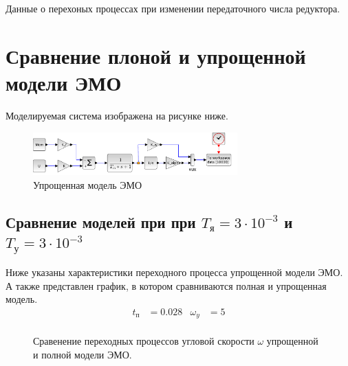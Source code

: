 \documentclass[a4paper, 12pt]{article}
\begin{document}
\begin{table}[h!]
    \centering
    \begin{threeparttable}
        \caption{Данные о перехоных процессах при изменении передаточного числа редуктора.}
        \end{threeparttable}
\end{table}

\newpage
\section{Сравнение плоной и упрощенной модели ЭМО}

Моделируемая система изображена на рисунке ниже.

\begin{figure}[h!]
    \centering
    \includegraphics[width = 0.7\textwidth]{images/EasyModel/easy-model.pdf}
    \caption{Упрощенная модель ЭМО}
\end{figure}

\subsection{Сравнение моделей при при $T_\text{я} = 3\cdot10^{-3}$ и $T_\text{у} = 3\cdot10^{-3}$}
Ниже указаны характеристики переходного процесса упрощенной модели ЭМО. А также представлен график, в котором сравниваются полная и упрощенная модель.
\begin{align*}
    t_\text{п} & = 0.028 & \omega_y & = 5 \\
\end{align*}

\begin{figure}[h!]
    \centering
    \caption{Сравенение переходных процессов угловой скорости $\omega$ упрощенной и полной модели ЭМО.}
\end{figure}
\end{document}
